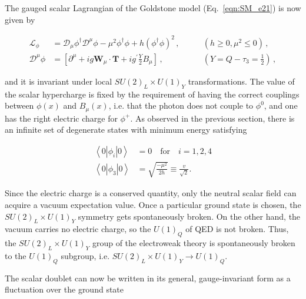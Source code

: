 The gauged scalar Lagrangian of the Goldstone model (Eq.~\ref{eqn:SM_e21}) is now given by

\begin{equation}\label{eqn:SM_e27}
\begin{aligned}
\mathcal{L}_\phi  & = \mathcal{D}_\mu\phi^\dag\mathcal{D}^\mu\phi - \mu^2\phi^\dag\phi + h(\phi^\dag\phi)^2 \, , & \qquad (h \geq 0, \mu^2 \leq 0) \, , \\
 \mathcal{D}^\mu\phi & =  [\partial^\mu + ig\textbf{W}_\mu \cdot \textbf{T} + ig^\prime\frac{Y}{2}B_\mu] \, , & \qquad (Y = Q - \tau_3 = \frac{1}{2}) \, , 
\end{aligned}
\end{equation}

\noindent and it is invariant under local $SU(2)_L \times U(1)_Y$ transformations.
The value of the scalar hypercharge is fixed by the requirement of having the correct couplings between $\phi(x)$ and $B_\mu(x)$, i.e. that the photon does not couple to $\phi^0$, and one has the right electric charge for $\phi^+$.
As observed in the previous section, there is an infinite set of degenerate states with minimum energy satisfying

\begin{equation}\label{eqn:SM_e29}
\begin{aligned}
\left\langle0|\phi_i|0\right\rangle & = 0 \quad \mbox{for} \quad i = 1,2,4\\
\left\langle0|\phi_3|0\right\rangle & = \sqrt{\frac{-\mu^2}{2h}} \equiv \frac{v}{\sqrt{2}}.
\end{aligned}
\end{equation}

Since the electric charge is a conserved quantity, only the neutral scalar field can acquire a vacuum expectation value.
Once a particular ground state is chosen, the $SU(2)_L\times U(1)_Y$ symmetry gets spontaneously broken.
On the other hand, the vacuum carries no electric charge, so the $U(1)_{Q}$ of QED is not broken.
Thus, the $SU(2)_L\times U(1)_Y$ group of the electroweak theory is spontaneously broken to the $U(1)_{Q}$ subgroup, i.e. $SU(2)_L \times U(1)_Y \rightarrow U(1)_Q$.

The scalar doublet can now be written in its general, gauge-invariant form as a fluctuation over the ground state

